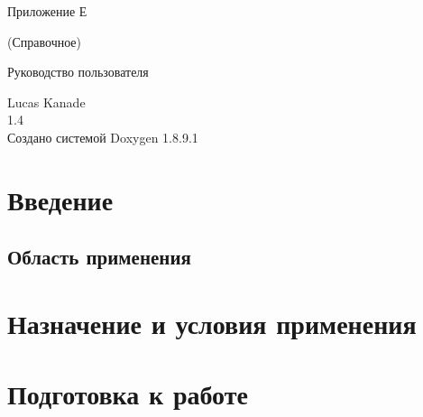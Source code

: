 \begin{center}
 Приложение Е
 
 (Справочное)
 
 Руководство пользователя
\end{center}




\vspace*{7cm}
\begin{center}%
\LARGE {Lucas Kanade}\\\large{1.4}\\
\vspace*{1cm}
{\large Создано системой Doxygen 1.8.9.1}\\
\end{center}

\newpage
\section*{Введение}
\subsection{Область применения}
\subsection{}
\subsection{}
\subsection{}

\section{Назначение и условия применения}
\subsection{}
\subsection{}


\section{Подготовка к работе}
\subsection{}
